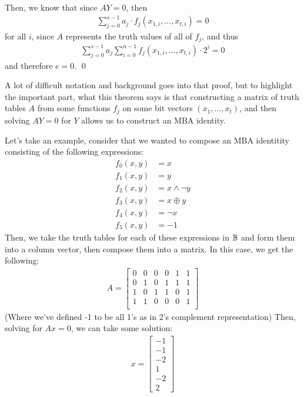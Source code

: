     Then, we know that since $AY = 0$, then
    \begin{align*}
        \sum_{j=0}^{s-1} a_j \cdot f_j(x_{1,i}, ..., x_{t, i}) = 0
    \end{align*}
    for all $i$, since $A$ represents the truth values of all of $f_j$, and thus 
    \begin{align*}
        \sum_{j=0}^{s-1} a_j \sum_{i=0}^{n-1} f_j(x_{1,i}, ..., x_{t, i}) \cdot 2^{i} = 0
    \end{align*}
    and therefore $e = 0$. \qed
\par A lot of difficult notation and background goes into that proof, but 
to highlight the important part, what this theorem says is that constructing
a matrix of truth tables $A$ from some functions $f_j$ on some bit vectors $(x_1, ..., x_t)$, 
and then solving $AY = 0$ for $Y$ allows us to construct an MBA identity.
\par Let's take an example, consider that we wanted to compose an MBA identitity consisting 
of the following expressions:
\begin{align*}
    f_0(x,y) &= x\\
    f_1(x,y) &= y\\
    f_2(x,y) &= x \land \neg y\\
    f_3(x,y) &= x \oplus y\\
    f_4(x,y) &= \neg x\\
    f_5(x,y) &= -1
\end{align*}
Then, we take the truth tables for each of these expressions in $\mathbb{B}$ 
and form them into a column vector, then compose them into a matrix.
In this case, we get the following:
\begin{align*}
    A =
    \begin{bmatrix}
        0 & 0 & 0 & 0 & 1 & 1\\
        0 & 1 & 0 & 1 & 1 & 1\\
        1 & 0 & 1 & 1 & 0 & 1\\
        1 & 1 & 0 & 0 & 0 & 1\\
    \end{bmatrix}
\end{align*}
(Where we've defined -1 to be all 1's as in 2's complement representation)
Then, solving for $Ax = 0$, we can take some solution:
\begin{align*}
    x = \begin{bmatrix}
    -1\\-1\\-2\\1\\-2\\2
    \end{bmatrix}
\end{align*}

